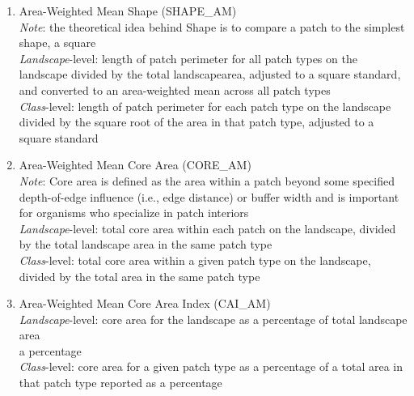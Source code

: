 \begin{enumerate}
	\item Area-Weighted Mean Shape (SHAPE\_AM)\\
	\emph{Note}: the theoretical idea behind Shape is to compare a patch to the simplest shape, a square 		\\
	\emph{Landscape}-level: length of patch perimeter for all patch types on the landscape divided by the total landscapearea, adjusted to a 
square standard, and converted to an area-weighted mean across all patch types \\
	\emph{Class}-level: length of patch perimeter for each patch type on the landscape divided by the square root of the area in that patch type, 
adjusted to a square standard\\
	
	
	\item Area-Weighted Mean Core Area (CORE\_AM)\\
	\emph{Note}: Core area is defined as the area within a patch beyond some specified depth-of-edge influence (i.e., edge distance) or buffer 
width and is important for organisms who specialize in patch interiors 	\\
	\emph{Landscape}-level: total core area within each patch on the landscape, divided by the total landscape area in the same patch type	\\
	\emph{Class}-level: total core area within a given patch type on the landscape, divided by the total area in the same patch type	\\
	
	\item Area-Weighted Mean Core Area Index (CAI\_AM)\\
	\emph{Landscape}-level: core area for the landscape as a percentage of total landscape area \\
a percentage	\\
	\emph{Class}-level: core area for a given patch type as a percentage of a total area in that patch type
reported as a percentage	\\
	

\end{enumerate}
